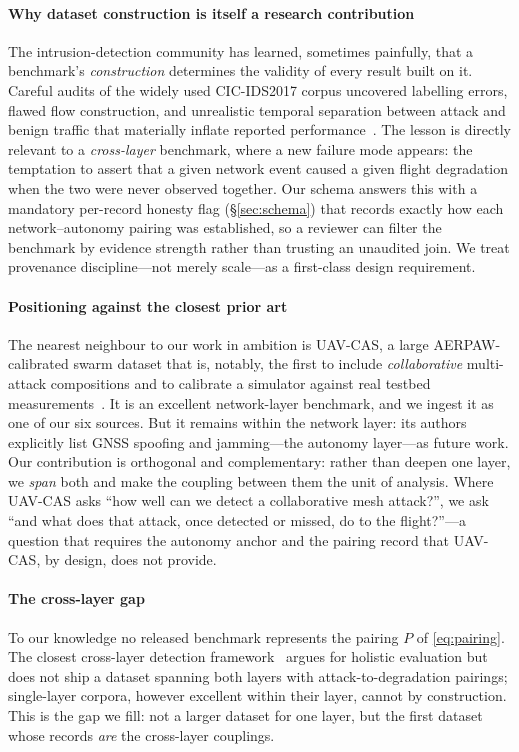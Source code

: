 \documentclass[conference]{IEEEtran}
\newcommand{\dataset}[1]{\textsc{#1}}
\begin{document}
\paragraph{Why dataset construction is itself a research contribution}
The intrusion-detection community has learned, sometimes painfully, that a
benchmark's \emph{construction} determines the validity of every result built on
it. Careful audits of the widely used CIC-IDS2017 corpus uncovered labelling
errors, flawed flow construction, and unrealistic temporal separation between
attack and benign traffic that materially inflate reported
performance~\cite{engelen2021troubleshooting,sharafaldin2018cicids}. The lesson
is directly relevant to a \emph{cross-layer} benchmark, where a new failure mode
appears: the temptation to assert that a given network event caused a given
flight degradation when the two were never observed together. Our schema answers
this with a mandatory per-record honesty flag (\S\ref{sec:schema}) that records
exactly how each network--autonomy pairing was established, so a reviewer can
filter the benchmark by evidence strength rather than trusting an unaudited join.
We treat provenance discipline---not merely scale---as a first-class design
requirement.

\paragraph{Positioning against the closest prior art}
The nearest neighbour to our work in ambition is \dataset{UAV-CAS}, a large
AERPAW-calibrated swarm dataset that is, notably, the first to include
\emph{collaborative} multi-attack compositions and to calibrate a simulator
against real testbed measurements~\cite{uavcas2026}. It is an excellent
network-layer benchmark, and we ingest it as one of our six sources. But it
remains within the network layer: its authors explicitly list GNSS
spoofing and jamming---the autonomy layer---as future work. Our contribution is
orthogonal and complementary: rather than deepen one layer, we \emph{span} both
and make the coupling between them the unit of analysis. Where \dataset{UAV-CAS}
asks ``how well can we detect a collaborative mesh attack?'', we ask ``and what
does that attack, once detected or missed, do to the flight?''---a question that
requires the autonomy anchor and the pairing record that \dataset{UAV-CAS}, by
design, does not provide.

\paragraph{The cross-layer gap}
To our knowledge no released benchmark represents the pairing $P$ of
\eqref{eq:pairing}. The closest cross-layer detection framework~\cite{hotd2023}
argues for holistic evaluation but does not ship a dataset spanning both layers
with attack-to-degradation pairings; single-layer corpora, however excellent
within their layer, cannot by construction. This is the gap we fill: not a
larger dataset for one layer, but the first dataset whose records \emph{are} the
cross-layer couplings.
\end{document}
